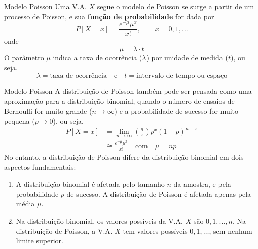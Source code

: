 \documentclass[10pt]{beamer}\usepackage[]{graphicx}\usepackage[]{color}
\providecommand{\E}{\text{E}}
\providecommand{\Var}{\text{Var}}
\theoremstyle{definition}
\begin{document}
\begin{frame}[fragile]{Modelo Poisson}
  Uma V.A. $X$ segue o modelo de Poisson se surge a partir de um
  processo de Poisson, e sua \textbf{função de probabilidade} for dada
  por
  \begin{equation*}
    P[X = x] = \frac{e^{-\mu} \mu^x}{x!}, \quad \quad x = 0, 1, \ldots
  \end{equation*}
  onde
  \begin{equation*}
    \mu = \lambda \cdot t
  \end{equation*}
  O parâmetro $\mu$ indica a taxa de ocorrência ($\lambda$) por unidade
  de medida ($t$), ou seja, %
  \begin{equation*}
    \lambda = \text{taxa de ocorrência} \quad \text{e} \quad t =
    \text{intervalo de tempo ou espaço}
  \end{equation*}
\end{frame}

\begin{frame}[fragile]{Modelo Poisson}
  \small
  A distribuição de Poisson também pode ser pensada como uma aproximação
  para a distribuição binomial, quando o número de ensaios de Bernoulli
  for muito grande ($n \rightarrow \infty$) e a probabilidade de sucesso
  for muito pequena ($p \rightarrow 0$), ou seja,
  \begin{align*}
    P[X=x] &= \lim_{n \rightarrow \infty} \binom{n}{x} p^x (1-p)^{n-x} \\
           &\cong \frac{e^{-\mu} \mu^x}{x!} \quad \text{com} \quad \mu
           = np
  \end{align*}
  No entanto, a distribuição de Poisson difere da distribuição binomial
  em dois aspectos fundamentais:
  \begin{enumerate}
  \item A distribuição binomial é afetada pelo tamanho $n$ da amostra, e
    pela probabilidade $p$ de sucesso. A distribuição de Poisson é
    afetada apenas pela média $\mu$.
  \item Na distribuição binomial, os valores possíveis da V.A. $X$ são
    $0, 1, \ldots, n$. Na distribuição de Poisson, a V.A. $X$ tem
    valores possíveis $0, 1, \ldots$, sem nenhum limite superior.
  \end{enumerate}
\end{frame}
\end{document}
